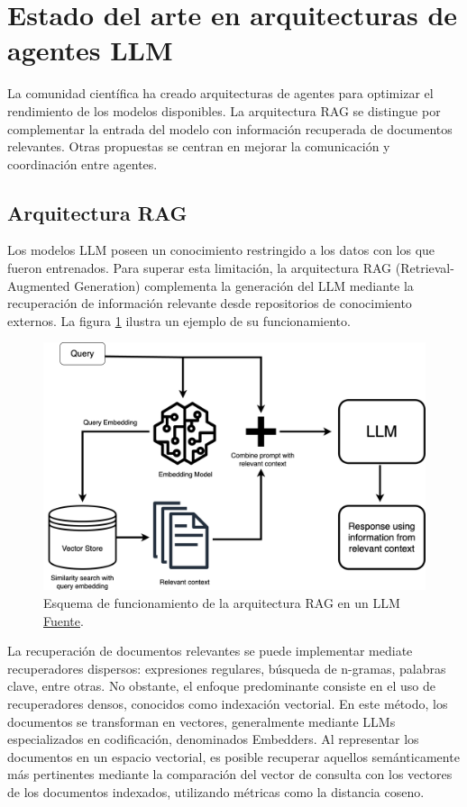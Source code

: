 \section{Estado del arte en arquitecturas de agentes LLM}

La comunidad científica ha creado arquitecturas de agentes para optimizar el rendimiento de los modelos disponibles. La arquitectura RAG se distingue por complementar la entrada del modelo con información recuperada de documentos relevantes. Otras propuestas se centran en mejorar la comunicación y coordinación entre agentes.

\subsection{Arquitectura RAG}

Los modelos LLM poseen un conocimiento restringido a los datos con los que fueron entrenados. Para superar esta limitación, la arquitectura RAG (Retrieval-Augmented Generation) complementa la generación del LLM mediante la recuperación de información relevante desde repositorios de conocimiento externos. La figura \ref{fig:rag} ilustra un ejemplo de su funcionamiento.    

\begin{figure}[H]
  \centering
  \includegraphics[width=0.5\linewidth]{figures/RAG.png}
  \caption{Esquema de funcionamiento de la arquitectura RAG en un LLM \href{https://www.clarifai.com/blog/what-is-rag-retrieval-augmented-generation}{Fuente}.}
  \label{fig:rag}
\end{figure}

La recuperación de documentos relevantes se puede implementar mediate recuperadores dispersos: expresiones regulares, búsqueda de n-gramas, palabras clave, entre otras. No obstante, el enfoque predominante consiste en el uso de recuperadores densos, conocidos como indexación vectorial. En este método, los documentos se transforman en vectores, generalmente mediante LLMs especializados en codificación, denominados Embedders. Al representar los documentos en un espacio vectorial, es posible recuperar aquellos semánticamente más pertinentes mediante la comparación del vector de consulta con los vectores de los documentos indexados, utilizando métricas como la distancia coseno.

